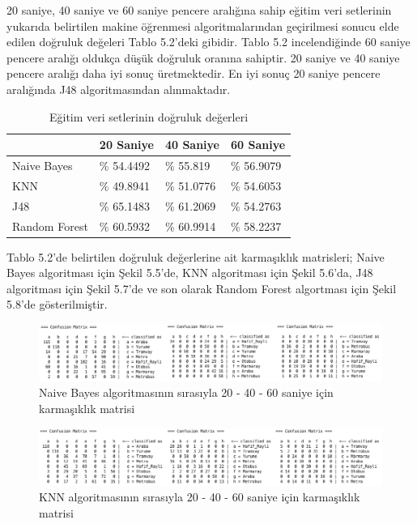 20 saniye, 40 saniye ve 60 saniye pencere aralığına sahip eğitim veri setlerinin yukarıda belirtilen makine öğrenmesi algoritmalarından geçirilmesi sonucu elde edilen doğruluk değeleri Tablo 5.2'deki gibidir. Tablo 5.2 incelendiğinde 60 saniye pencere aralığı oldukça düşük doğruluk oranına sahiptir. 20 saniye ve 40 saniye pencere aralığı daha iyi sonuç üretmektedir. En iyi sonuç 20 saniye pencere aralığında J48 algoritmasından alınmaktadır.
\begin{table}[!htbp]
\centering
\caption{Eğitim veri setlerinin doğruluk değerleri}
\label{my-label}
\begin{tabular}{|l|l|l|l|}
\hline
              & 20 Saniye  & 40 Saniye  & 60 Saniye  \\ \hline
Naive Bayes   & \% 54.4492 & \% 55.819  & \% 56.9079 \\ \hline
KNN           & \% 49.8941 & \% 51.0776 & \% 54.6053 \\ \hline
J48           & \% 65.1483 & \% 61.2069 & \% 54.2763 \\ \hline
Random Forest & \% 60.5932 & \% 60.9914 & \% 58.2237 \\ \hline
\end{tabular}
\end{table}
\newpage
Tablo 5.2'de belirtilen doğruluk değerlerine ait karmaşıklık matrisleri; Naive Bayes algoritması için Şekil 5.5'de, KNN algoritması için Şekil 5.6'da, J48 algoritması için Şekil 5.7'de ve son olarak Random Forest algortması için Şekil 5.8'de gösterilmiştir.

\begin{figure}[!h]
\centering
\includegraphics[width=\textwidth]{projectChapters/images/NB.png}
\caption{Naive Bayes algoritmasının sırasıyla 20 - 40 - 60 saniye için karmaşıklık matrisi}
\end{figure}

\begin{figure}[!h]
\centering
\includegraphics[width=\textwidth]{projectChapters/images/KNN.png}
\caption{KNN algoritmasının sırasıyla 20 - 40 - 60 saniye için karmaşıklık matrisi}
\end{figure}

